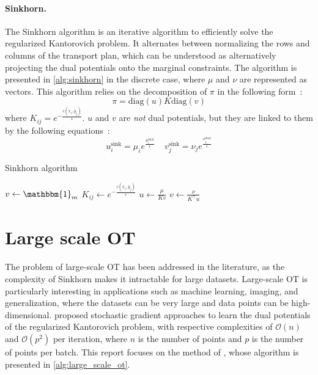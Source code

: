 \documentclass[a4paper,11pt]{article}
\newcommand{\1}{\mathbbm{1}}
\begin{document}
\paragraph{Sinkhorn.}The Sinkhorn algorithm is an iterative algorithm to efficiently solve the regularized Kantorovich problem. It alternates between normalizing the rows and columns of the transport plan, which can be understood as alternatively projecting the dual potentials onto the marginal constraints. The algorithm is presented in \cref{alg:sinkhorn} in the discrete case, where $\mu$ and $\nu$ are represented as vectors. This algorithm relies on the decomposition of $\pi$ in the following form~:
\begin{equation}
    \pi = \mathrm{diag}(u)K\mathrm{diag}(v)
\end{equation}
where $K_{ij} = e^{-\frac{c(x_i, y_j)}{\epsilon}}$. $u$ and $v$ are \emph{not} dual potentials, but they are linked to them by the following equations~:
\begin{equation}
    u_i^{\mathrm{sink}} = \mu_i e^{\frac{u_i^{\mathrm{dual}}}{\epsilon}}~~~~~ v_j^{\mathrm{sink}} = \nu_j e^{\frac{v_j^{\mathrm{dual}}}{\epsilon}}
\end{equation}
\begin{algorithm}[H]
    \caption{Sinkhorn algorithm}
    \label{alg:sinkhorn}
    \begin{algorithmic}
        \State $v \leftarrow \1_m$
        \State $K_{ij} \leftarrow e^{-\frac{c(x_i, y_j)}{\epsilon}}$
            \State $u \leftarrow \frac{\mu}{Kv}$
            \State $v \leftarrow \frac{\nu}{K^{\top}u}$
        \EndWhile
    \end{algorithmic}
\end{algorithm}

\section{Large scale OT}
\label{sec:large_scale_ot}

\paragraph{}The problem of large-scale OT has been addressed in the literature, as the complexity of Sinkhorn makes it intractable for large datasets. Large-scale OT is particularly interesting in applications such as machine learning, imaging, and generalization, where the datasets can be very large and data points can be high-dimensional. \citet{NIPS2016_2a27b814,seguy2018largescaleoptimaltransportmapping} proposed stochastic gradient approaches to learn the dual potentials of the regularized Kantorovich problem, with respective complexities of $\mathcal{O}(n)$ and $\mathcal{O}(p^2)$ per iteration, where $n$ is the number of points and $p$ is the number of points per batch. This report focuses on the method of \citet{seguy2018largescaleoptimaltransportmapping}, whose algorithm is presented in \cref{alg:large_scale_ot}.
\end{document}
